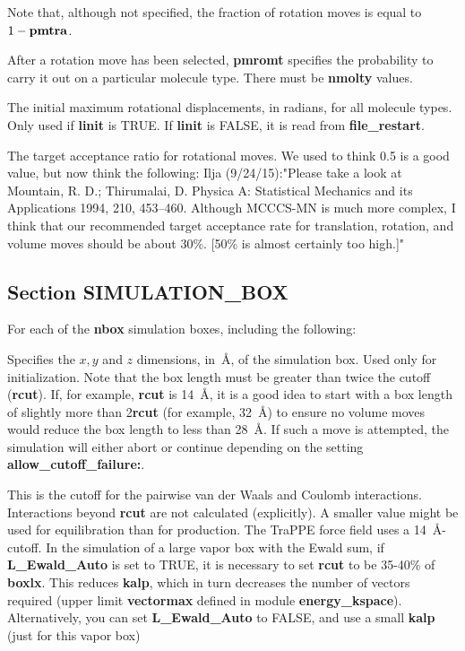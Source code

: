 \documentclass[12pt,letterpaper]{article}
\begin{document}
Note that, although not specified, the fraction of rotation
moves is equal to $1 - {\bf pmtra}$.

 After a rotation move has been
selected, {\bf pmromt} specifies the probability to carry it
out on a particular molecule type. There must be {\bf
  nmolty} values.

 The initial maximum rotational
displacements, in radians, for all molecule types. Only used
if {\bf linit} is TRUE. If {\bf linit} is FALSE, it is read
from {\bf file\_restart}.

 The target acceptance ratio for
rotational moves. We used to think 0.5 is a good value,
but now think the following:
Ilja (9/24/15):"Please take a look at 
Mountain, R. D.; Thirumalai, D. Physica A: Statistical Mechanics and its Applications
1994, 210, 453–460.
Although MCCCS-MN is much more complex, I think that our
recommended target acceptance rate for translation, rotation,
and volume moves should be about 30\%.  [50\% is almost certainly too high.]"

\subsection{Section \textbf{SIMULATION\_BOX}}
For each of the \textbf{nbox} simulation boxes, including
the following:

 Specifies the $x, y$ and
$z$ dimensions, in~\AA, of the simulation box. Used only for
initialization. Note that the box length must be greater
than twice the cutoff ({\bf rcut}). If, for example, {\bf
  rcut} is 14~\AA, it is a good idea to start with a box
length of slightly more than 2{\bf rcut} (for example,
32~\AA) to ensure no volume moves would reduce the box
length to less than 28~\AA. If such a move is attempted, the
simulation will either abort or continue depending on the
setting {\bf allow\_cutoff\_failure:}.

 This is the cutoff for the pairwise van
der Waals and Coulomb interactions. Interactions beyond {\bf
  rcut} are not calculated (explicitly). A smaller value
might be used for equilibration than for production. The
TraPPE force field uses a 14~\AA-cutoff. In the simulation
of a large vapor box with the Ewald sum, if {\bf
  L\_Ewald\_Auto} is set to TRUE, it is necessary to set
{\bf rcut} to be 35-40\% of {\bf boxlx}. This reduces {\bf
  kalp}, which in turn decreases the number of vectors
required (upper limit {\bf vectormax} defined in module {\bf
  energy\_kspace}). Alternatively, you can set {\bf
  L\_Ewald\_Auto} to FALSE, and use a small {\bf kalp} (just
for this vapor box)
\end{document}

